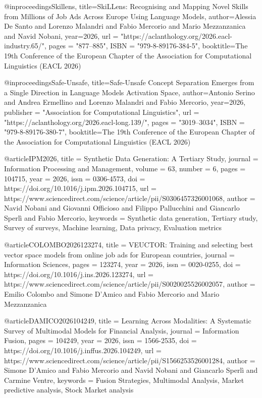 @inproceedings{Skillens,
      title={SkiLLens: Recognising and Mapping Novel Skills from Millions of Job Ads Across Europe Using Language Models}, 
      author={Alessia De Santo and Lorenzo Malandri and Fabio Mercorio and Mario Mezzanzanica and Navid Nobani},
      year={2026},
      url = "https://aclanthology.org/2026.eacl-industry.65/",
    pages = "877--885",
    ISBN = "979-8-89176-384-5",
      booktitle={The 19th Conference of the European Chapter of the Association for Computational Linguistics (EACL 2026)} 
}

@inproceedings{Safe-Unsafe,
      title={Safe-Unsafe Concept Separation Emerges from a Single Direction in Language Models Activation Space}, 
      author={Antonio Serino and Andrea Ermellino and Lorenzo Malandri and Fabio Mercorio},
      year={2026},
      publisher = "Association for Computational Linguistics",
    url = "https://aclanthology.org/2026.eacl-long.139/",
    pages = "3019--3034",
    ISBN = "979-8-89176-380-7",
      booktitle={The 19th Conference of the European Chapter of the Association for Computational Linguistics (EACL 2026)} 
}


@article{IPM2026,
title = {Synthetic Data Generation: A Tertiary Study},
journal = {Information Processing and Management},
volume = {63},
number = {6},
pages = {104715},
year = {2026},
issn = {0306-4573},
doi = {https://doi.org/10.1016/j.ipm.2026.104715},
url = {https://www.sciencedirect.com/science/article/pii/S0306457326001068},
author = {Navid Nobani and Giovanni Officioso and Filippo Pallucchini and Giancarlo Sperlì and Fabio Mercorio},
keywords = {Synthetic data generation, Tertiary study, Survey of surveys, Machine learning, Data privacy, Evaluation metrics}
}


@article{COLOMBO2026123274,
title = {VEUCTOR: Training and selecting best vector space models from online job ads for European countries},
journal = {Information Sciences},
pages = {123274},
year = {2026},
issn = {0020-0255},
doi = {https://doi.org/10.1016/j.ins.2026.123274},
url = {https://www.sciencedirect.com/science/article/pii/S0020025526002057},
author = {Emilio Colombo and Simone D'Amico and Fabio Mercorio and Mario Mezzanzanica}
}


@article{DAMICO2026104249,
title = {Learning Across Modalities: A Systematic Survey of Multimodal Models for Financial Analysis},
journal = {Information Fusion},
pages = {104249},
year = {2026},
issn = {1566-2535},
doi = {https://doi.org/10.1016/j.inffus.2026.104249},
url = {https://www.sciencedirect.com/science/article/pii/S1566253526001284},
author = {Simone D'Amico and Fabio Mercorio and Navid Nobani and Giancarlo Sperlì and Carmine Ventre},
keywords = {Fusion Strategies, Multimodal Analysis, Market predictive analysis, Stock Market analysis}
}




